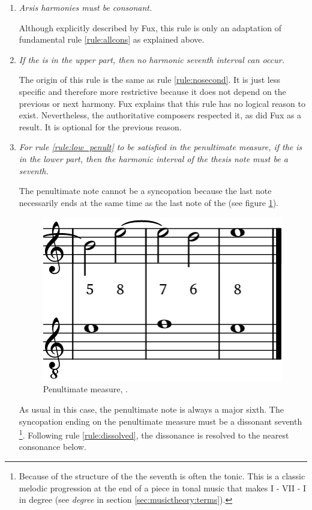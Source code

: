 \begin{enumerate}[wide, label=\bfseries 4.H\arabic*]
    \item\label{rule:arsiscons} \textit{Arsis harmonies must be consonant.} \parencite[p.78]{GaPFr}
    
    Although explicitly described by Fux, this rule is only an adaptation of fundamental rule \ref{rule:allcons} as explained above.

    \item\label{rule:noseventh} \textit{If the \cf is in the upper part, then no harmonic seventh interval can occur.}

    The origin of this rule is the same as rule \ref{rule:nosecond}. It is just less specific and therefore more restrictive because it does not depend on the previous or next harmony. Fux explains that this rule has no logical reason to exist. Nevertheless, the authoritative composers respected it, as did Fux as a result. It is optional for the previous reason.

    \item\label{rule:lowpenult4th} \textit{For rule \ref{rule:low_penult} to be satisfied in the penultimate measure, if the \cf is in the lower part, then the harmonic interval of the thesis note must be a seventh.}

    The penultimate note cannot be a syncopation because the last note necessarily ends at the same time as the last note of the \cf (see figure \ref{fig:penultlow4sp}).
    \begin{figure}[h]
        \centering
        \includegraphics[height=\fh]{Images/penult_4th.png}
        \caption{Penultimate measure, .}
        \label{fig:penultlow4sp}
    \end{figure}
    
    As usual in this case, the penultimate note is always a major sixth. The syncopation ending on the penultimate measure must be a dissonant seventh \footnote{Because of the structure of the \cfcomma the seventh is often the tonic. This is a classic melodic progression at the end of a piece in tonal music that makes I - VII - I in degree (see \textit{degree} in section \ref{sec:musictheory:terms}).}. Following rule \ref{rule:dissolved}, the dissonance is resolved to the nearest consonance below.
    

\end{enumerate}
